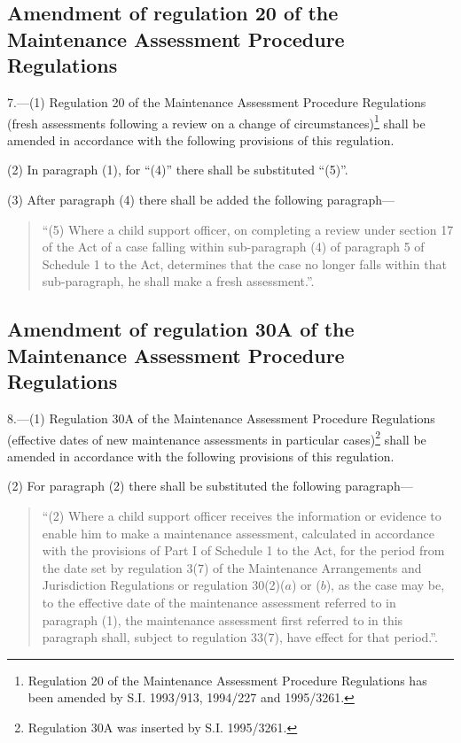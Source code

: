 \documentclass[12pt,a4paper]{article}
\begin{document}
\subsection[7. Amendment of regulation 20 of the Maintenance Assessment Procedure Regulations]{Amendment of regulation 20 of the Maintenance Assessment Procedure Regulations}

7.—(1) Regulation 20 of the Maintenance Assessment Procedure Regulations (fresh assessments following a review on a change of circumstances)\footnote{\frenchspacing Regulation 20 of the Maintenance Assessment Procedure Regulations has been amended by S.I. 1993/913, 1994/227 and 1995/3261.} shall be amended in accordance with the following provisions of this regulation.

(2) In paragraph (1), for “(4)” there shall be substituted “(5)”.

(3) After paragraph (4) there shall be added the following paragraph—
\begin{quotation}
“(5) Where a child support officer, on completing a review under section 17 of the Act of a case falling within sub-paragraph (4) of paragraph 5 of Schedule 1 to the Act, determines that the case no longer falls within that sub-paragraph, he shall make a fresh assessment.”.
\end{quotation}

\subsection[8. Amendment of regulation 30A of the Maintenance Assessment Procedure Regulations]{Amendment of regulation 30A of the Maintenance Assessment Procedure Regulations}

8.—(1) Regulation 30A of the Maintenance Assessment Procedure Regulations (effective dates of new maintenance assessments in particular cases)\footnote{\frenchspacing Regulation 30A was inserted by S.I. 1995/3261.} shall be amended in accordance with the following provisions of this regulation.

(2) For paragraph (2) there shall be substituted the following paragraph—
\begin{quotation}
“(2) Where a child support officer receives the information or evidence to enable him to make a maintenance assessment, calculated in accordance with the provisions of Part I of Schedule 1 to the Act, for the period from the date set by regulation 3(7) of the Maintenance Arrangements and Jurisdiction Regulations or regulation 30(2)($a$) or ($b$), as the case may be, to the effective date of the maintenance assessment referred to in paragraph (1), the maintenance assessment first referred to in this paragraph shall, subject to regulation 33(7), have effect for that period.”.
\end{quotation}
\end{document}
